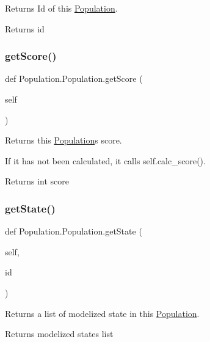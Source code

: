 Returns Id of this \mbox{\hyperlink{classPopulation_1_1Population}{Population}}. 

\begin{DoxyReturn}{Returns}
id 
\end{DoxyReturn}
\mbox{\label{classPopulation_1_1Population_a19c0905329170d9cadec9b7b6ed04c4c}} 
\subsubsection{\texorpdfstring{getScore()}{getScore()}}
{\footnotesize\ttfamily def Population.\+Population.\+get\+Score (\begin{DoxyParamCaption}\item[{}]{self }\end{DoxyParamCaption})}



Returns this \mbox{\hyperlink{classPopulation_1_1Population}{Population}}\textquotesingle{}s score. 

If it has not been calculated, it calls self.\+calc\+\_\+score(). \begin{DoxyReturn}{Returns}
int score 
\end{DoxyReturn}
\mbox{\label{classPopulation_1_1Population_a69e191c3b2aa8d415858bc358658d31f}} 
\subsubsection{\texorpdfstring{getState()}{getState()}}
{\footnotesize\ttfamily def Population.\+Population.\+get\+State (\begin{DoxyParamCaption}\item[{}]{self,  }\item[{}]{id }\end{DoxyParamCaption})}



Returns a list of modelized state in this \mbox{\hyperlink{classPopulation_1_1Population}{Population}}. 

\begin{DoxyReturn}{Returns}
modelized states list 
\end{DoxyReturn}
\mbox{\label{classPopulation_1_1Population_a03c2737cca878a0929f5a183fe6e5106}} 
